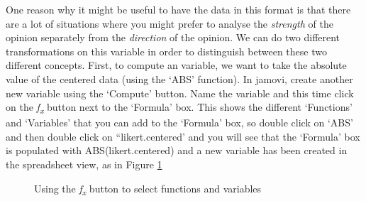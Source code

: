 One reason why it might be useful to have the data in this format is that there are a lot of situations where you might prefer to analyse the {\it strength} of the opinion separately from the {\it direction} of the opinion. We can do two different transformations on this  variable in order to distinguish between these two different concepts. First, to compute an  variable, we want to take the absolute value of the centered data (using the `ABS' function). In jamovi, create another new variable using the `Compute' button. Name the variable  and this time click on the {\it f\textsubscript{x}} button next to the `Formula' box. This shows the different `Functions' and `Variables' that you can add to the `Formula' box, so double click on `ABS' and then double click on ``likert.centered' and you will see that the `Formula' box is populated with ABS(likert.centered) and a new variable has been created in the spreadsheet view, as in Figure \ref{fig:opinionstrength}

\begin{figure}[!htb]
\begin{center}
\caption{Using the {\it f\textsubscript{x}} button to select functions and variables}
\label{fig:opinionstrength}
\HR
\end{center}
\end{figure}

